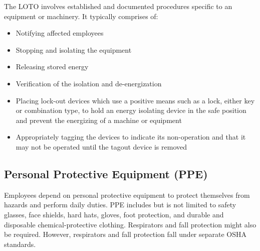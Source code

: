 \begin{itemize}
The LOTO involves established and documented procedures specific to an equipment or machinery.  It typically comprises of:\\
\begin{itemize}
\item Notifying affected employees
\item Stopping and isolating the equipment
\item Releasing stored energy
\item Verification of the isolation and de-energization
\item Placing lock-out devices which use a positive means such as a lock, either key or combination type, to hold an energy isolating device in the safe position and prevent the energizing of a machine or equipment
\item Appropriately tagging the devices to indicate its non-operation and that it may not be operated until the tagout device is removed
\end{itemize}

\subsection{Personal Protective Equipment (PPE)}
Employees depend on personal protective equipment to protect themselves from hazards and perform daily duties. PPE includes but is not limited to safety glasses, face shields, hard hats, gloves, foot protection, and durable and disposable chemical-protective clothing. Respirators and fall protection might also be required. However, respirators and fall protection fall under separate OSHA standards. \\


\end{itemize}

